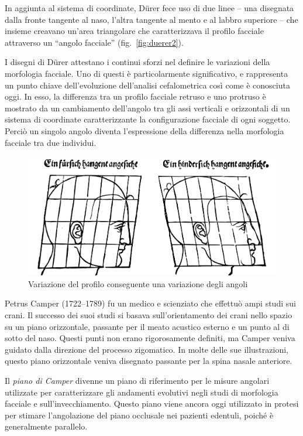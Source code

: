In aggiunta al sistema di coordinate, Dürer fece uso di due linee -- una disegnata dalla fronte tangente al naso, l'altra tangente al mento e al labbro superiore -- che insieme creavano un'area triangolare che caratterizzava il profilo facciale attraverso un ``angolo facciale'' (fig.~\vref{fig:duerer2}).

I disegni di Dürer attestano i continui sforzi nel definire le variazioni della morfologia facciale. Uno di questi è particolarmente significativo, e rappresenta un punto chiave dell'evoluzione dell'analisi cefalometrica così come è conosciuta oggi. In esso, la differenza tra un profilo facciale retruso e uno protruso è mostrato da un cambiamento dell'angolo tra gli assi verticali e orizzontali di un sistema di coordinate caratterizzante la configurazione facciale di ogni soggetto. Perciò un singolo angolo diventa l'espressione della differenza nella morfologia facciale tra due individui.\\

\begin{figure}[ht!]
 \centering
 \includegraphics[width=.5\textwidth]{./images/duerer-proportional-3.pdf}
 \caption{Variazione del profilo conseguente una variazione degli angoli}
 \label{fig:duerer3}
\end{figure}

Petrus Camper (1722--1789) fu un medico e scienziato che effettuò ampi studi sui crani. Il successo dei suoi studi si basava sull'orientamento dei crani nello spazio su un piano orizzontale, passante per il meato acustico esterno e un punto al di sotto del naso. Questi punti non erano rigorosamente definiti, ma Camper veniva guidato dalla direzione del processo zigomatico. In molte delle sue illustrazioni, questo piano orizzontale veniva disegnato passante per la spina nasale anteriore.

Il \textit{piano di Camper} divenne un piano di riferimento per le misure angolari utilizzate per caratterizzare gli andamenti evolutivi negli studi di morfologia facciale e sull'in\-vec\-chi\-a\-men\-to. Questo piano viene ancora oggi utilizzato in protesi per stimare l'angolazione del piano occlusale nei pazienti edentuli, poiché è generalmente parallelo.

